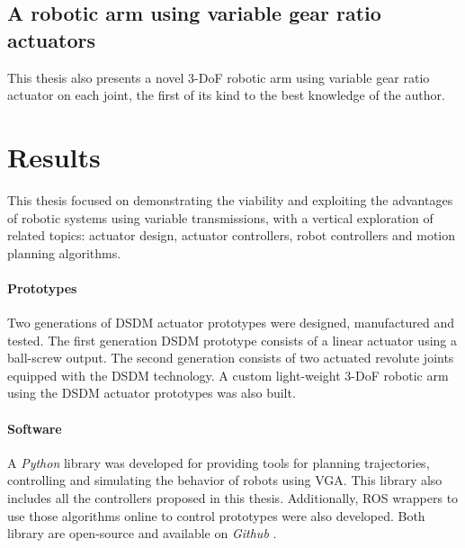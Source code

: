 \subsection{A robotic arm using variable gear ratio actuators}

This thesis also presents a novel 3-DoF robotic arm using variable gear ratio actuator on each joint, the first of its kind to the best knowledge of the author. %

\newpage

\section{Results}
\label{sec:mainresults}


This thesis focused on demonstrating the viability and exploiting the advantages of robotic systems using variable transmissions, with a vertical exploration of related topics: actuator design, actuator controllers, robot controllers and motion planning algorithms.

\paragraph{Prototypes}
%
Two generations of DSDM actuator prototypes were designed, manufactured and tested. The first generation DSDM prototype consists of a linear actuator using a ball-screw output. The second generation consists of two actuated revolute joints equipped with the DSDM technology. A custom light-weight 3-DoF robotic arm using the DSDM actuator prototypes was also built. %

\paragraph{Software}
%
A \emph{Python} library was developed for providing tools for planning trajectories, controlling and simulating the behavior of robots using VGA. This library also includes all the controllers proposed in this thesis. Additionally, ROS wrappers to use those algorithms online to control prototypes were also developed. Both library are open-source and available on \emph{Github} \cite{girard_github.com/alx87grd/alexrobotics_2017}\cite{girard_github.com/alx87grd/dsdm_robotics_ros_2017}.


